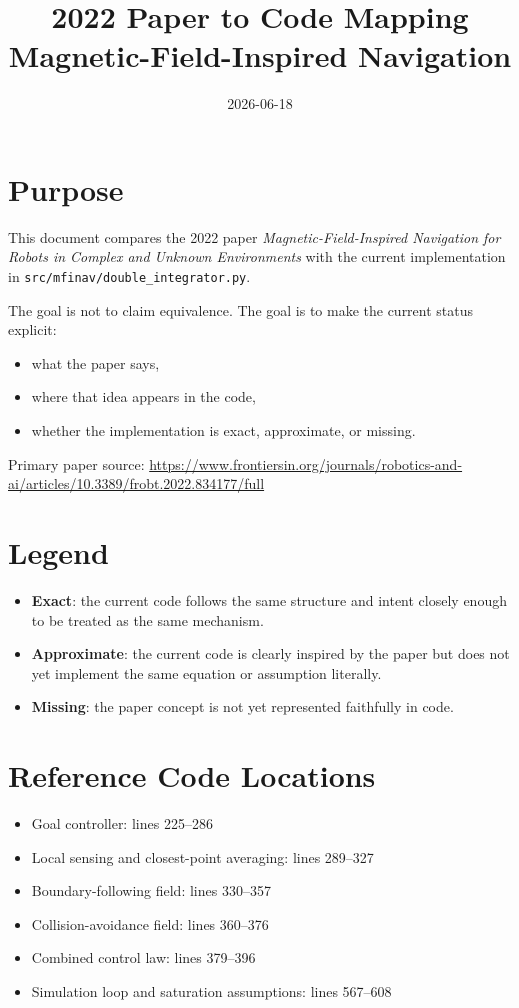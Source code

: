 \documentclass[11pt]{article}
\title{2022 Paper to Code Mapping\\Magnetic-Field-Inspired Navigation}
\author{}
\date{2026-06-18}
\begin{document}
\maketitle

\section*{Purpose}

This document compares the 2022 paper
\emph{Magnetic-Field-Inspired Navigation for Robots in Complex and Unknown Environments}
with the current implementation in
\texttt{src/mfinav/double\_integrator.py}.

The goal is not to claim equivalence. The goal is to make the current status
explicit:

\begin{itemize}[leftmargin=*]
  \item what the paper says,
  \item where that idea appears in the code,
  \item whether the implementation is exact, approximate, or missing.
\end{itemize}

Primary paper source:
\url{https://www.frontiersin.org/journals/robotics-and-ai/articles/10.3389/frobt.2022.834177/full}

\section*{Legend}

\begin{itemize}[leftmargin=*]
  \item \textbf{Exact}: the current code follows the same structure and intent closely enough to be treated as the same mechanism.
  \item \textbf{Approximate}: the current code is clearly inspired by the paper but does not yet implement the same equation or assumption literally.
  \item \textbf{Missing}: the paper concept is not yet represented faithfully in code.
\end{itemize}

\section*{Reference Code Locations}

\begin{itemize}[leftmargin=*]
  \item Goal controller: lines 225--286
  \item Local sensing and closest-point averaging: lines 289--327
  \item Boundary-following field: lines 330--357
  \item Collision-avoidance field: lines 360--376
  \item Combined control law: lines 379--396
  \item Simulation loop and saturation assumptions: lines 567--608
\end{itemize}
\end{document}
